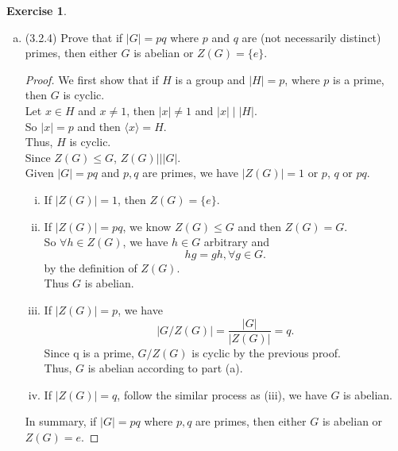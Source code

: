 \documentclass[14pt]{amsart}
\theoremstyle{plain}
\theoremstyle{definition}
\newtheorem{exer}[lem]{Exercise}
\begin{document}
\begin{exer}
\begin{enumerate}[(a)]
\item (3.2.4) Prove that if $|G|=pq$ where $p$ and $q$ are (not necessarily distinct) primes, then either $G$ is abelian or $Z(G)=\{e\}$.
  \begin{proof}
	We first show that if $H$ is a group and $|H| = p$, where $p$ is a prime, then $G$ is cyclic.\\
	Let $x \in H$ and $x \neq 1$, then $|x| \neq 1$ and $|x| \mid |H|$.\\
	So $|x| = p$ and then $\langle x\rangle = H$. \\
	Thus, $H$ is cyclic.\\
	Since $Z(G) \leq G$, $Z(G)| \mid |G|$.\\
	Given $|G| =pq$ and $p,q$ are primes, we have
	$|Z(G)| = 1$ or $p$, $q$ or $pq$.\\
	\begin{enumerate}[(i)]
	  \item If $|Z(G)| = 1$, then $Z(G) = \{e\}$.
	  \item If $|Z(G)| = pq$, we know $Z(G) \leq G$ and then $Z(G) = G$.\\ 
		So $\forall h\in Z(G)$, we have $h \in G$ arbitrary and  
	  	\[ hg= gh,\forall g \in G.\] 
		by the definition of $Z(G)$.\\
		Thus $G$ is abelian.
	  \item
		If $|Z(G)| = p$, we have 
		\[|G/Z(G)| = \frac{|G|}{|Z(G)|} = q.\]
		Since q is a prime, $G/Z(G)$ is cyclic by the previous proof.\\
		Thus, $G$ is abelian according to part (a).
 	  \item 
		If $|Z(G)| = q$, follow the similar process as (iii), we have $G$ is abelian.
	\end{enumerate}
		In summary, if $|G| = pq$ where $p,q$ are primes, then either $G$ is abelian or $Z(G) = {e}$.

  \end{proof}

\end{enumerate}
\end{exer}
\end{document}
